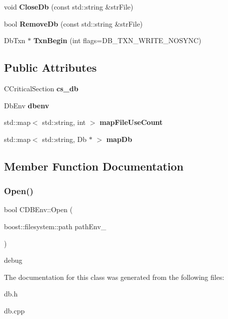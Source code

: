 \begin{DoxyCompactItemize}
\mbox{\label{class_c_d_b_env_ac53fd53afdd1e0881b8ffbb11a89b556}} 
void {\bfseries Close\+Db} (const std\+::string \&str\+File)
\item 
\mbox{\label{class_c_d_b_env_a1a53f94daf3096e047d7b041e6a885d6}} 
bool {\bfseries Remove\+Db} (const std\+::string \&str\+File)
\item 
\mbox{\label{class_c_d_b_env_a5f1daab338b2098ea693efad6edefb9b}} 
Db\+Txn $\ast$ {\bfseries Txn\+Begin} (int flags=D\+B\+\_\+\+T\+X\+N\+\_\+\+W\+R\+I\+T\+E\+\_\+\+N\+O\+S\+Y\+NC)
\end{DoxyCompactItemize}
\subsection*{Public Attributes}
\begin{DoxyCompactItemize}
\item 
\mbox{\label{class_c_d_b_env_af71bf28f9142c38aedc550353270b2b7}} 
C\+Critical\+Section {\bfseries cs\+\_\+db}
\item 
\mbox{\label{class_c_d_b_env_a50a70690e7f688f5e92a972e7fa18668}} 
Db\+Env {\bfseries dbenv}
\item 
\mbox{\label{class_c_d_b_env_a3b8a3caf48395ef3f05e3717b33bf32c}} 
std\+::map$<$ std\+::string, int $>$ {\bfseries map\+File\+Use\+Count}
\item 
\mbox{\label{class_c_d_b_env_a89184b6635285b963fa4d80fc292b386}} 
std\+::map$<$ std\+::string, Db $\ast$ $>$ {\bfseries map\+Db}
\end{DoxyCompactItemize}


\subsection{Member Function Documentation}
\mbox{\label{class_c_d_b_env_a1a81be1585305e5cedd2bccd6c7570c3}} 
\subsubsection{\texorpdfstring{Open()}{Open()}}
{\footnotesize\ttfamily bool C\+D\+B\+Env\+::\+Open (\begin{DoxyParamCaption}\item[{boost\+::filesystem\+::path}]{path\+Env\+\_\+ }\end{DoxyParamCaption})}

debug 

The documentation for this class was generated from the following files\+:\begin{DoxyCompactItemize}
\item 
db.\+h\item 
db.\+cpp\end{DoxyCompactItemize}
